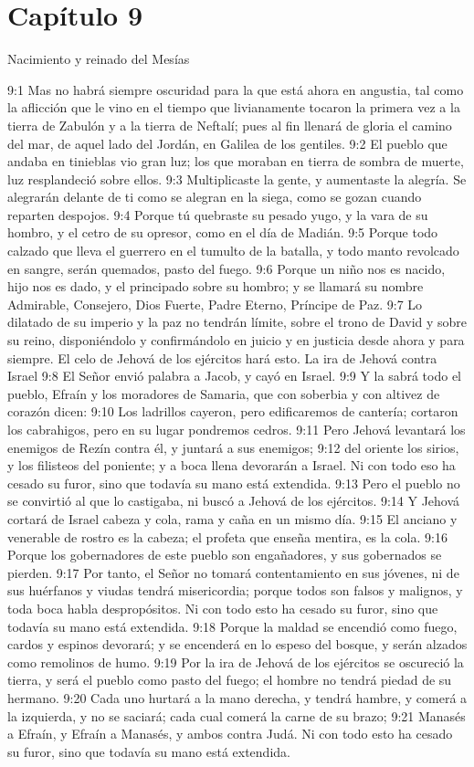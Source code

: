 \section*{Capítulo 9}
Nacimiento y reinado del Mesías 
 
9:1 Mas no habrá siempre oscuridad para la que está ahora en angustia, tal como la aflicción que le vino en el tiempo que livianamente tocaron la primera vez a la tierra de Zabulón y a la tierra de Neftalí; pues al fin llenará de gloria el camino del mar, de aquel lado del Jordán, en Galilea de los gentiles. 
9:2 El pueblo que andaba en tinieblas vio gran luz; los que moraban en tierra de sombra de muerte, luz resplandeció sobre ellos. 
9:3 Multiplicaste la gente, y aumentaste la alegría. Se alegrarán delante de ti como se alegran en la siega, como se gozan cuando reparten despojos. 
9:4 Porque tú quebraste su pesado yugo, y la vara de su hombro, y el cetro de su opresor, como en el día de Madián. 
9:5 Porque todo calzado que lleva el guerrero en el tumulto de la batalla, y todo manto revolcado en sangre, serán quemados, pasto del fuego. 
9:6 Porque un niño nos es nacido, hijo nos es dado, y el principado sobre su hombro; y se llamará su nombre Admirable, Consejero, Dios Fuerte, Padre Eterno, Príncipe de Paz. 
9:7 Lo dilatado de su imperio y la paz no tendrán límite, sobre el trono de David y sobre su reino, disponiéndolo y confirmándolo en juicio y en justicia desde ahora y para siempre. El celo de Jehová de los ejércitos hará esto. 
La ira de Jehová contra Israel 
9:8 El Señor envió palabra a Jacob, y cayó en Israel. 
9:9 Y la sabrá todo el pueblo, Efraín y los moradores de Samaria, que con soberbia y con altivez de corazón dicen: 
9:10 Los ladrillos cayeron, pero edificaremos de cantería; cortaron los cabrahigos, pero en su lugar pondremos cedros. 
9:11 Pero Jehová levantará los enemigos de Rezín contra él, y juntará a sus enemigos; 
9:12 del oriente los sirios, y los filisteos del poniente; y a boca llena devorarán a Israel. Ni con todo eso ha cesado su furor, sino que todavía su mano está extendida. 
9:13 Pero el pueblo no se convirtió al que lo castigaba, ni buscó a Jehová de los ejércitos. 
9:14 Y Jehová cortará de Israel cabeza y cola, rama y caña en un mismo día. 
9:15 El anciano y venerable de rostro es la cabeza; el profeta que enseña mentira, es la cola. 
9:16 Porque los gobernadores de este pueblo son engañadores, y sus gobernados se pierden. 
9:17 Por tanto, el Señor no tomará contentamiento en sus jóvenes, ni de sus huérfanos y viudas tendrá misericordia; porque todos son falsos y malignos, y toda boca habla despropósitos. Ni con todo esto ha cesado su furor, sino que todavía su mano está extendida. 
9:18 Porque la maldad se encendió como fuego, cardos y espinos devorará; y se encenderá en lo espeso del bosque, y serán alzados como remolinos de humo. 
9:19 Por la ira de Jehová de los ejércitos se oscureció la tierra, y será el pueblo como pasto del fuego; el hombre no tendrá piedad de su hermano. 
9:20 Cada uno hurtará a la mano derecha, y tendrá hambre, y comerá a la izquierda, y no se saciará; cada cual comerá la carne de su brazo; 
9:21 Manasés a Efraín, y Efraín a Manasés, y ambos contra Judá. Ni con todo esto ha cesado su furor, sino que todavía su mano está extendida. 
